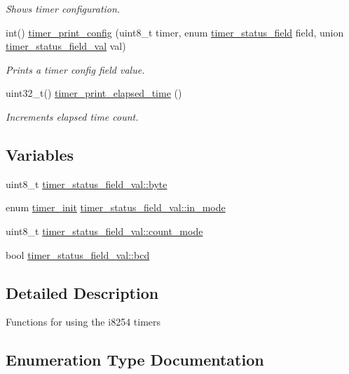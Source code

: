 \begin{DoxyCompactItemize}
\begin{DoxyCompactList}\small\item\em Shows timer configuration. \end{DoxyCompactList}\item 
int() \hyperlink{group__timer_gad3902e029b27c80982873394c0290496}{timer\+\_\+print\+\_\+config} (uint8\+\_\+t timer, enum \hyperlink{group__timer_gada782f3116a896caaa602b70c0c6d8b7}{timer\+\_\+status\+\_\+field} field, union \hyperlink{uniontimer__status__field__val}{timer\+\_\+status\+\_\+field\+\_\+val} val)
\begin{DoxyCompactList}\small\item\em Prints a timer config field value. \end{DoxyCompactList}\item 
uint32\+\_\+t() \hyperlink{group__timer_ga43b221cba0c39b32f89688dcfee5aefa}{timer\+\_\+print\+\_\+elapsed\+\_\+time} ()
\begin{DoxyCompactList}\small\item\em Increments elapsed time count. \end{DoxyCompactList}\end{DoxyCompactItemize}
\subsection*{Variables}
\begin{DoxyCompactItemize}
\item 
uint8\+\_\+t \hyperlink{group__timer_ga37d15361e9d111d7f18f943d85964f51}{timer\+\_\+status\+\_\+field\+\_\+val\+::byte}
\item 
enum \hyperlink{group__timer_ga5cc20f14fd50625eea9b20f58fbe2a55}{timer\+\_\+init} \hyperlink{group__timer_ga16c0028c537ce578196381bdc0cd97fd}{timer\+\_\+status\+\_\+field\+\_\+val\+::in\+\_\+mode}
\item 
uint8\+\_\+t \hyperlink{group__timer_ga069cd58184fd977a3345d560f159037a}{timer\+\_\+status\+\_\+field\+\_\+val\+::count\+\_\+mode}
\item 
bool \hyperlink{group__timer_gad1c0daae1fe44fc16a05f435123a99f2}{timer\+\_\+status\+\_\+field\+\_\+val\+::bcd}
\end{DoxyCompactItemize}


\subsection{Detailed Description}
Functions for using the i8254 timers 

\subsection{Enumeration Type Documentation}
\mbox{\label{group__timer_ga5cc20f14fd50625eea9b20f58fbe2a55}} 
